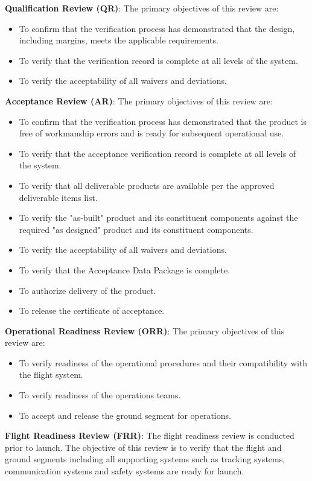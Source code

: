\textbf{Qualification Review (QR)}: The primary objectives of this review are:
\begin{itemize}
\item To confirm that the verification process has demonstrated that the design, including margins, meets the applicable requirements.
\item To verify that the verification record is complete at all levels of the system.
\item To verify the acceptability of all waivers and deviations. 
\end{itemize}

\textbf{Acceptance Review (AR)}: The primary objectives of this review are:
\begin{itemize}
\item To confirm that the verification process has demonstrated that the product is free of workmanship errors and is ready for subsequent operational use.
\item To verify that the acceptance verification record is complete at all levels of the system.
\item  To verify that all deliverable products are available per the approved deliverable items list.
\item To verify the "as-built" product and its constituent components against the required "as designed" product and its constituent components.
\item To verify the acceptability of all waivers and deviations.
\item To verify that the Acceptance Data Package is complete.
\item To authorize delivery of the product.
\item To release the certificate of acceptance.
\end{itemize}

\textbf{Operational Readiness Review (ORR)}: The primary objectives of this review are:
\begin{itemize}
\item To verify readiness of the operational procedures and their compatibility with the flight system.
\item To verify readiness of the operations teams.
\item To accept and release the ground segment for operations.
\end{itemize}

\textbf{Flight Readiness Review (FRR)}: The flight readiness review is conducted prior to launch. The objective of this review is to verify that the flight and ground segments including all supporting systems such as tracking systems, communication systems and safety systems are ready for launch.

